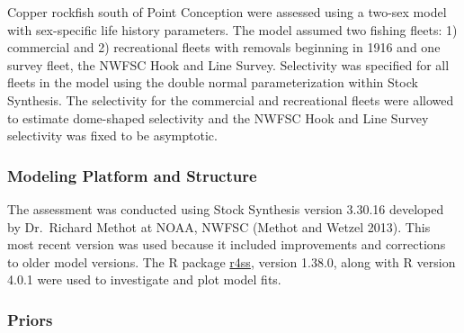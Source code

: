 \documentclass[11pt,
  english,
  a4paper,
]{article}
\begin{document}
\leavevmode\tagmcend\tagstructend


Copper rockfish south of Point Conception were assessed using a two-sex model with sex-specific life history parameters. The model assumed two fishing fleets: 1) commercial and 2) recreational fleets with removals beginning in 1916 and one survey fleet, the NWFSC Hook and Line Survey. Selectivity was specified for all fleets in the model using the double normal parameterization within Stock Synthesis. The selectivity for the commercial and recreational fleets were allowed to estimate dome-shaped selectivity and the NWFSC Hook and Line Survey selectivity was fixed to be asymptotic.

\leavevmode\tagmcend\tagstructend\par


\hypertarget{modeling-platform-and-structure}{%
\subsubsection{Modeling Platform and Structure}\label{modeling-platform-and-structure}}

\leavevmode\tagmcend\tagstructend


The assessment was conducted using Stock Synthesis version 3.30.16 developed by Dr.~Richard Methot at NOAA, NWFSC {(Methot and Wetzel 2013)\leavevmode\tagmcend\tagstructend}. This most recent version was used because it included improvements and corrections to older model versions. The R package {\href{https://github.com/r4ss/r4ss}{r4ss}\leavevmode\tagmcend\tagstructend}, version 1.38.0, along with R version 4.0.1 were used to investigate and plot model fits.

\leavevmode\tagmcend\tagstructend\par


\hypertarget{priors}{%
\subsubsection{Priors}\label{priors}}

\leavevmode\tagmcend\tagstructend
\end{document}
